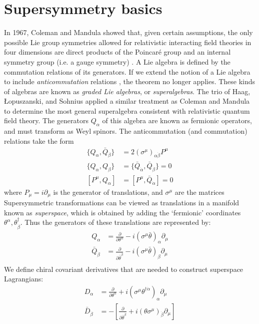 \section{Supersymmetry basics}
In 1967, Coleman and Mandula \citep{Coleman1967} showed that, given certain assumptions, the only possible Lie group symmetries allowed for relativistic interacting field theories in four dimensions are direct products of the Poincar\'e group and an internal symmetry group (i.e. a gauge symmetry) \citep{Mandula2015}.
A Lie algebra is defined by the commutation relations of its generators. If we extend the notion of a Lie algebra to include \emph{anticommutation} relations \citep{Wess1992}, the theorem no longer applies. These kinds of algebras are known as \emph{graded Lie algebras}, or \emph{superalgebras}. The trio of Haag, Łopuszanski, and Sohnius \citep{Haag1975} applied a similar treatment as Coleman and Mandula to determine the most general superalgebra consistent with relativistic quantum field theory. The generators $Q_\alpha$ of this algebra are known as fermionic operators, and must transform as Weyl spinors. The anticommutation (and commutation) relations take the form
\begin{align*}
  \{Q_\alpha, \bar{Q}_{\dot{\beta}}\} &= 2(\sigma^\mu)_{\alpha\dot{\beta}}P^\mu\\
  \{Q_\alpha, Q_\beta\} &= \{\bar{Q}_{\dot{\alpha}}, \bar{Q}_{\dot{\beta}}\} = 0\\
  [P^\mu,Q_\alpha] &= [P^\mu,\bar{Q}_{\dot{\alpha}}] = 0
\end{align*}
where $P_\mu = i\partial_\mu$ is the generator of translations, and $\sigma^\mu$ are the matrices
Supersymmetric transformations can be viewed as translations in a manifold known as \emph{superspace}, which is obtained by adding the `fermionic' coordinates $\theta^\alpha, \theta^\dagger_{\dot{\beta}}$. Thus the generators of these translations are represented by:
\begin{align*}
  Q_\alpha &= \frac{\partial}{\partial\theta^\alpha}-i(\sigma^\mu\bar{\theta})_\alpha\partial_\mu\\
  \bar{Q}_{\dot{\beta}} &= \frac{\partial}{\partial\bar{\theta}^{\dot{\beta}}}-i(\sigma^\mu\bar{\theta})_\beta\partial_\mu\\
\end{align*}
We define chiral covariant derivatives that are needed to construct superspace Lagrangians:
\begin{align*}
  D_\alpha &= \frac{\partial}{\partial\theta^\alpha}+i(\sigma^\mu\theta^{\dagger\dot{\alpha}})_\alpha\partial_\mu\\
  \bar{D}_{\dot{\beta}} &= -\left[\frac{\partial}{\partial\bar{\theta}^{\dot{\beta}}}+i(\theta\sigma^\mu)_{\dot{\beta}}\partial_\mu\right]
\end{align*}
